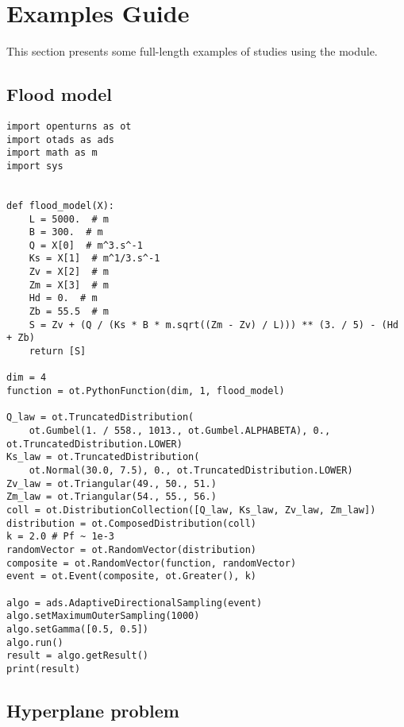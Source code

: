 % 




\section{Examples Guide}

This section presents some full-length examples of studies using the module.

\subsection{Flood model}


\begin{lstlisting}
import openturns as ot
import otads as ads
import math as m
import sys


def flood_model(X):
    L = 5000.  # m
    B = 300.  # m
    Q = X[0]  # m^3.s^-1
    Ks = X[1]  # m^1/3.s^-1
    Zv = X[2]  # m
    Zm = X[3]  # m
    Hd = 0.  # m
    Zb = 55.5  # m
    S = Zv + (Q / (Ks * B * m.sqrt((Zm - Zv) / L))) ** (3. / 5) - (Hd + Zb)
    return [S]
    
dim = 4
function = ot.PythonFunction(dim, 1, flood_model)

Q_law = ot.TruncatedDistribution(
    ot.Gumbel(1. / 558., 1013., ot.Gumbel.ALPHABETA), 0., ot.TruncatedDistribution.LOWER)
Ks_law = ot.TruncatedDistribution(
    ot.Normal(30.0, 7.5), 0., ot.TruncatedDistribution.LOWER)
Zv_law = ot.Triangular(49., 50., 51.)
Zm_law = ot.Triangular(54., 55., 56.)
coll = ot.DistributionCollection([Q_law, Ks_law, Zv_law, Zm_law])
distribution = ot.ComposedDistribution(coll)
k = 2.0 # Pf ~ 1e-3
randomVector = ot.RandomVector(distribution)
composite = ot.RandomVector(function, randomVector)
event = ot.Event(composite, ot.Greater(), k)

algo = ads.AdaptiveDirectionalSampling(event)
algo.setMaximumOuterSampling(1000)
algo.setGamma([0.5, 0.5])
algo.run()
result = algo.getResult()
print(result)
\end{lstlisting}

\subsection{Hyperplane problem}


